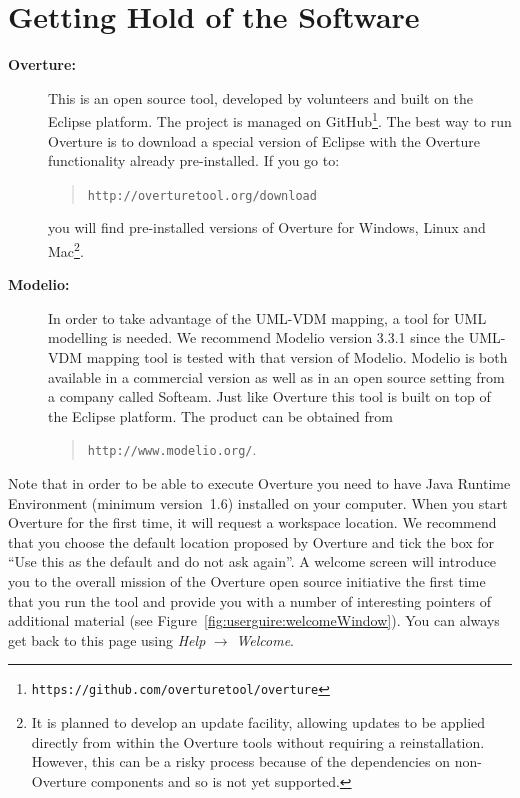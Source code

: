 \documentclass{overturerepchap}
\newcommand{\url}[1]{\texttt{#1}}
\begin{document}
\chapter{Getting Hold of the Software}\label{sec:install}

\begin{description}
\item[\textbf{Overture:}] This
 is an open source tool, developed by volunteers and built on
the Eclipse platform. The project is managed on
GitHub\footnote{\url{https://github.com/overturetool/overture}}.
The best way to run Overture is to download a special version of
Eclipse with the Overture functionality already pre-installed. If you
go to:
  \begin{quote}
  \url{http://overturetool.org/download}
  \end{quote}
  \noindent you will find pre-installed versions of Overture for
  Windows, Linux and Mac\footnote{It is planned to develop an update
    facility, allowing updates to be applied directly from within the
    Overture tools without requiring a reinstallation. However, this
    can be a risky process because of the dependencies on non-Overture
    components and so is not yet supported.}.

\item[\textbf{Modelio:}] In order to take advantage of the UML-VDM
  mapping, a tool for UML modelling is needed. We recommend Modelio
  version 3.3.1 since the UML-VDM mapping tool is tested with that
  version of Modelio. Modelio is both available in a commercial
  version as well as in an open source setting from a company called
  Softeam. Just like Overture this tool is built on top of the Eclipse
  platform. The product can be obtained from
\begin{quote}
\url{http://www.modelio.org/}.
\end{quote}
\end{description}

Note that in order to be able
to execute Overture you need to have Java Runtime Environment (minimum
version~1.6) installed on your computer.
When you start Overture for the first time, it will request a workspace
location. We recommend that you choose the default location proposed
by Overture and tick the box for ``Use this as the default and do
not ask again''. A welcome screen will introduce you to the overall
mission of the Overture open source initiative the first time that you
run the tool and provide you with a number of interesting pointers of
additional material (see
Figure~\ref{fig:userguire:welcomeWindow}). You
can always get back to this page using \emph{Help} $ \rightarrow$
\emph{Welcome}.
\end{document}
